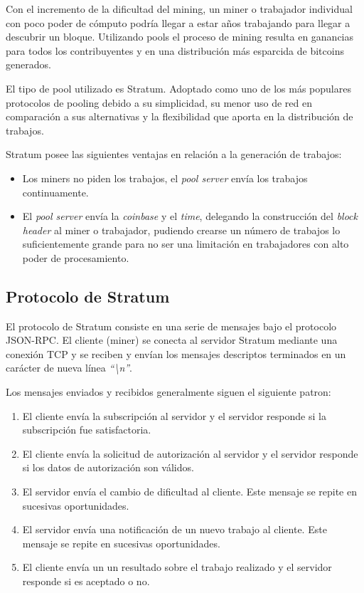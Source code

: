 \documentclass[a4paper, 10pt, twoside]{article}
\begin{document}
Con el incremento de la dificultad del mining, un miner o trabajador individual con poco poder de cómputo podría llegar a estar años trabajando para llegar a descubrir un bloque. Utilizando pools el proceso de mining resulta en ganancias para todos los contribuyentes y en una distribución más esparcida de bitcoins generados.

El tipo de pool utilizado es Stratum. Adoptado como uno de los más populares protocolos de pooling debido a su simplicidad, su menor uso de red en comparación a sus alternativas y la flexibilidad que aporta en la distribución de trabajos.

Stratum posee las siguientes ventajas en relación a la generación de trabajos:
\begin{itemize}
\item Los miners no piden los trabajos, el \textit{pool server} envía los trabajos continuamente.
\item El \textit{pool server} envía la \textit{coinbase} y el \textit{time}, delegando la construcción del \textit{block header} al miner o trabajador, pudiendo crearse un número de trabajos lo suficientemente grande para no ser una limitación en trabajadores con alto poder de procesamiento.
\end{itemize}

\subsection{Protocolo de Stratum}

El protocolo de Stratum consiste en una serie de mensajes bajo el protocolo JSON-RPC. El cliente (miner) se conecta al servidor Stratum mediante una conexión TCP y se reciben y envían los mensajes descriptos terminados en un carácter de nueva línea \textit{``\textbackslash n''}.

Los mensajes enviados y recibidos generalmente siguen el siguiente patron:
\begin{enumerate}
	\item El cliente envía la subscripción al servidor y el servidor responde si la subscripción fue satisfactoria.
	\item El cliente envía la solicitud de autorización al servidor y el servidor responde si los datos de autorización son válidos.
	\item El servidor envía el cambio de dificultad al cliente. Este mensaje se repite en sucesivas oportunidades.
	\item El servidor envía una notificación de un nuevo trabajo al cliente. Este mensaje se repite en sucesivas oportunidades.
	\item El cliente envía un un resultado sobre el trabajo realizado y el servidor responde si es aceptado o no.
\end{enumerate}
\end{document}
